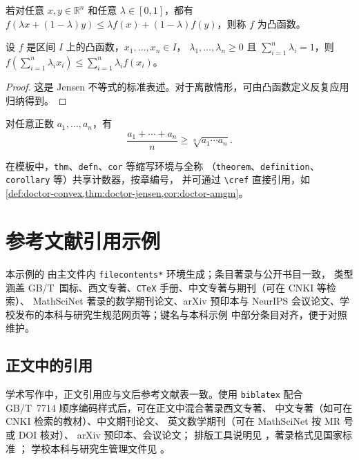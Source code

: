 \begin{defn}\label{def:doctor-convex}
若对任意 $x,y\in \mathbb{R}^n$ 和任意 $\lambda\in[0,1]$，都有
$f(\lambda x+(1-\lambda)y)\le \lambda f(x)+(1-\lambda)f(y)$，则称 $f$ 为凸函数。
\end{defn}

\begin{thm}[Jensen不等式]\label{thm:doctor-jensen}
设 $f$ 是区间 $I$ 上的凸函数，$x_1,\dots,x_n\in I$，
$\lambda_1,\dots,\lambda_n\ge 0$ 且 $\sum_{i=1}^{n}\lambda_i=1$，则
$f\!\left(\sum_{i=1}^{n}\lambda_i x_i\right)\le \sum_{i=1}^{n}\lambda_i f(x_i)$。
\end{thm}

\begin{proof}
这是 Jensen 不等式的标准表述。对于离散情形，可由凸函数定义反复应用归纳得到。
\end{proof}

\begin{cor}\label{cor:doctor-amgm}
对任意正数 $a_1,\dots,a_n$，有
\[
\frac{a_1+\cdots+a_n}{n}\ge \sqrt[n]{a_1\cdots a_n}.
\]
\end{cor}

\begin{rmk}
在模板中，\texttt{thm}、\texttt{defn}、\texttt{cor} 等缩写环境与全称
（\texttt{theorem}、\texttt{definition}、\texttt{corollary} 等）共享计数器，按章编号，
并可通过 \texttt{\textbackslash cref} 直接引用，如 \cref{def:doctor-convex,thm:doctor-jensen,cor:doctor-amgm}。
\end{rmk}

\chapter{参考文献引用示例}\label{ch:doctor-bib}

\noindent 本示例的  由主文件内 \texttt{filecontents*} 环境生成；条目著录与公开书目一致，
类型涵盖 GB/T~国标、西文专著、\texttt{CTeX} 手册、中文专著与期刊（可在 CNKI 等检索）、
MathSciNet 著录的数学期刊论文、arXiv 预印本与 NeurIPS 会议论文、学校发布的本科与研究生规范网页等；键名与本科示例  中部分条目对齐，便于对照维护。

\section{正文中的引用}
学术写作中，正文引用应与文后参考文献表一致。使用 \texttt{biblatex} 配合
GB/T~7714 顺序编码样式后，可在正文中混合著录西文专著\cite{knuth1984texbook,lamport1994latex,mittelbach2004companion}、
中文专著（如可在 CNKI 检索的教材）\cite{zhouzhihua2016ml}、中文期刊论文\cite{liguojie2012bigdata}、
英文数学期刊（可在 MathSciNet 按 MR 号或 DOI 核对）\cite{WalpuskiZhang2021DMJ}、
arXiv 预印本\cite{taubes2020compactness}、会议论文\cite{vaswani2017attention}；
排版工具说明见 \cite{ctex2022}，著录格式见国家标准 \cite{gbt7714}；
学校本科与研究生管理文件见 \cite{swu2021thesisManageNotice,swuUndergradThesisSpecWeb,swu2022gradThesisSpecDoc}。

